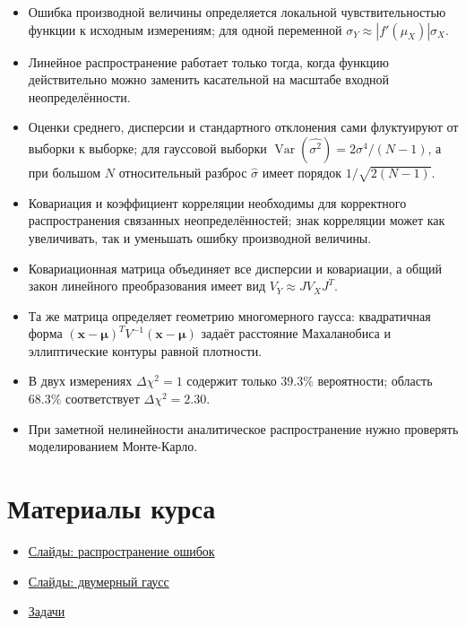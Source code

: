 \documentclass[
  russian,
  12pt,
  a4paper,
  a4paper,
  openany]{scrbook}
\providecommand{\tightlist}{%
  \setlength{\itemsep}{0pt}\setlength{\parskip}{0pt}}
\begin{document}
\begin{bookchaptersummary}

\begin{itemize}
\tightlist
\item
  Ошибка производной величины определяется локальной чувствительностью
  функции к исходным измерениям; для одной переменной
  \(\sigma_Y\approx|f'(\mu_X)|\sigma_X\).
\item
  Линейное распространение работает только тогда, когда функцию
  действительно можно заменить касательной на масштабе входной
  неопределённости.
\item
  Оценки среднего, дисперсии и стандартного отклонения сами флуктуируют
  от выборки к выборке; для гауссовой выборки
  \(\operatorname{Var}(\widehat{\sigma^2})=2\sigma^4/(N-1)\), а при
  большом \(N\) относительный разброс \(\widehat\sigma\) имеет порядок
  \(1/\sqrt{2(N-1)}\).
\item
  Ковариация и коэффициент корреляции необходимы для корректного
  распространения связанных неопределённостей; знак корреляции может как
  увеличивать, так и уменьшать ошибку производной величины.
\item
  Ковариационная матрица объединяет все дисперсии и ковариации, а общий
  закон линейного преобразования имеет вид \(V_Y\approx JV_XJ^T\).
\item
  Та же матрица определяет геометрию многомерного гаусса: квадратичная
  форма \((\mathbf x-\boldsymbol\mu)^TV^{-1}(\mathbf x-\boldsymbol\mu)\)
  задаёт расстояние Махаланобиса и эллиптические контуры равной
  плотности.
\item
  В двух измерениях \(\Delta\chi^2=1\) содержит только \(39.3\%\)
  вероятности; область \(68.3\%\) соответствует \(\Delta\chi^2=2.30\).
\item
  При заметной нелинейности аналитическое распространение нужно
  проверять моделированием Монте-Карло.
\end{itemize}

\end{bookchaptersummary}

\section{Материалы
курса}\label{ux43cux430ux442ux435ux440ux438ux430ux43bux44b-ux43aux443ux440ux441ux430-3}

\begin{itemize}
\tightlist
\item
  \href{https://neutrinohit.github.io/statistical-analysis-course/ru/slides/05_error_propagation.html}{Слайды:
  распространение ошибок}
\item
  \href{https://neutrinohit.github.io/statistical-analysis-course/ru/slides/06_two_dimensional_gaussian.html}{Слайды:
  двумерный гаусс}
\item
  \href{https://neutrinohit.github.io/statistical-analysis-course/ru/slides/exercises/05_error_propagation_and_covariance_exercises.html}{Задачи}
\end{itemize}
\end{document}
